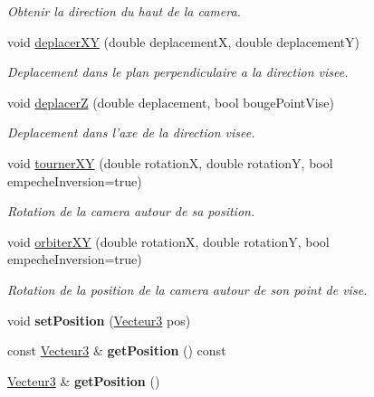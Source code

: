 \begin{DoxyCompactItemize}
\begin{DoxyCompactList}\small\item\em Obtenir la direction du haut de la camera. \end{DoxyCompactList}\item 
void \hyperlink{classvue_1_1_camera_aa08801e436ddf90400e632e402183618}{deplacer\-X\-Y} (double deplacement\-X, double deplacement\-Y)
\begin{DoxyCompactList}\small\item\em Deplacement dans le plan perpendiculaire a la direction visee. \end{DoxyCompactList}\item 
void \hyperlink{classvue_1_1_camera_a7e8dfbbf743a74bb0387e140fee09474}{deplacer\-Z} (double deplacement, bool bouge\-Point\-Vise)
\begin{DoxyCompactList}\small\item\em Deplacement dans l'axe de la direction visee. \end{DoxyCompactList}\item 
void \hyperlink{classvue_1_1_camera_a07795ebc629c68f8694b9ae08a53457f}{tourner\-X\-Y} (double rotation\-X, double rotation\-Y, bool empeche\-Inversion=true)
\begin{DoxyCompactList}\small\item\em Rotation de la camera autour de sa position. \end{DoxyCompactList}\item 
void \hyperlink{classvue_1_1_camera_a5e88216d5d5b31e0e65be9674e5904ef}{orbiter\-X\-Y} (double rotation\-X, double rotation\-Y, bool empeche\-Inversion=true)
\begin{DoxyCompactList}\small\item\em Rotation de la position de la camera autour de son point de vise. \end{DoxyCompactList}\item 
\hypertarget{classvue_1_1_camera_a1919234ae75d9bf57fc10fb600ea29e1}{void {\bfseries set\-Position} (\hyperlink{group__utilitaire_ga541aa4837ad9250d3a248dc82ee9ad4d}{Vecteur3} pos)}\label{classvue_1_1_camera_a1919234ae75d9bf57fc10fb600ea29e1}

\item 
\hypertarget{classvue_1_1_camera_ae1e82c701ed10d3e82984a21ddbc4636}{const \hyperlink{group__utilitaire_ga541aa4837ad9250d3a248dc82ee9ad4d}{Vecteur3} \& {\bfseries get\-Position} () const }\label{classvue_1_1_camera_ae1e82c701ed10d3e82984a21ddbc4636}

\item 
\hypertarget{classvue_1_1_camera_ab94bfe20e0d55cc1aef25e8fd13ea01b}{\hyperlink{group__utilitaire_ga541aa4837ad9250d3a248dc82ee9ad4d}{Vecteur3} \& {\bfseries get\-Position} ()}\label{classvue_1_1_camera_ab94bfe20e0d55cc1aef25e8fd13ea01b}


\end{DoxyCompactItemize}
